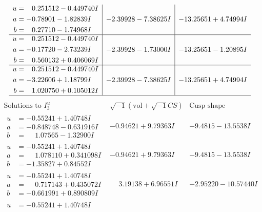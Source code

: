 \documentclass[1p]{elsarticle_modified}
\theoremstyle{definition}
\newcommand{\I}{\sqrt{-1}}
\begin{document}
$$\begin{array}{c|c|c}
\begin{aligned}
u &= \phantom{-}0.251512 - 0.449740 I \\
a &= -0.78901 - 1.82839 I \\
b &= \phantom{-}0.27710 - 1.74968 I\end{aligned}
 & -2.39928 - 7.38625 I & -13.25651 + 4.74994 I \\ \hline\begin{aligned}
u &= \phantom{-}0.251512 - 0.449740 I \\
a &= -0.17720 - 2.73239 I \\
b &= \phantom{-}0.560132 + 0.406069 I\end{aligned}
 & -2.39928 - 1.73000 I & -13.25651 - 1.20895 I \\ \hline\begin{aligned}
u &= \phantom{-}0.251512 - 0.449740 I \\
a &= -3.22606 + 1.18799 I \\
b &= \phantom{-}1.020750 + 0.105012 I\end{aligned}
 & -2.39928 - 7.38625 I & -13.25651 + 4.74994 I\\
 \hline 
 \end{array}$$\newpage$$\begin{array}{c|c|c}  
\text{Solutions to }I^u_{3}& \I (\text{vol} + \sqrt{-1}CS) & \text{Cusp shape}\\
 \hline 
\begin{aligned}
u &= -0.55241 + 1.40748 I \\
a &= -0.848748 - 0.631916 I \\
b &= \phantom{-}1.07565 - 1.32900 I\end{aligned}
 & -0.94621 + 9.79363 I & -9.4815 - 13.5538 I \\ \hline\begin{aligned}
u &= -0.55241 + 1.40748 I \\
a &= \phantom{-}1.078110 + 0.341098 I \\
b &= -1.35827 + 0.84552 I\end{aligned}
 & -0.94621 + 9.79363 I & -9.4815 - 13.5538 I \\ \hline\begin{aligned}
u &= -0.55241 + 1.40748 I \\
a &= \phantom{-}0.717143 + 0.435072 I \\
b &= -0.661991 + 0.890809 I\end{aligned}
 & \phantom{-}3.19138 + 6.96551 I & -2.95220 - 10.57440 I \\ \hline\begin{aligned}
u &= -0.55241 + 1.40748 I \\

\end{aligned}
\end{array}$$
\end{document}
